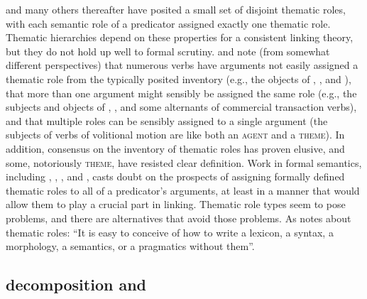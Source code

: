 \documentclass[output=paper
	        ,collection
	        ,collectionchapter
 	        ,biblatex
                ,babelshorthands
                ,newtxmath
                ,draftmode
                ,colorlinks, citecolor=brown
]{langscibook}
\begin{document}
\citet{Fillmore1968} and many others thereafter have posited a small set of disjoint thematic roles, with each semantic role of a predicator assigned exactly one thematic role.
Thematic hierarchies depend on these properties for a consistent linking theory, but they do not hold up well to formal scrutiny.
\citet{Jackendoff1987} and \citet{Dowty1991} note (from somewhat different perspectives) that numerous verbs have arguments not easily assigned a thematic role from the typically posited inventory (e.g., the objects of , , and ), that more than one argument might sensibly be assigned the same role (e.g., the subjects and objects of , , and some alternants of commercial transaction verbs), and that multiple roles can be sensibly assigned to a single argument (the subjects of verbs of volitional motion are like both an \textsc{agent} and a \textsc{theme}).
In addition, consensus on the inventory of thematic roles has proven elusive, and some, notoriously \textsc{theme}, have resisted clear definition.
Work in formal semantics, including \citet{LadusawandDowty1988}, \citet{Dowty1989}, \citet{Landman2000}, and \cite{Schein2002}, casts doubt on the prospects of assigning formally defined thematic roles to all of a predicator's arguments, at least in a manner that would allow them to play a crucial part in linking.
Thematic role types seem to pose problems, and there are alternatives that avoid those problems.  As \citet{Carlson1998} notes about thematic roles: ``It is easy to conceive of how to write a lexicon, a syntax, a morphology, a semantics, or a pragmatics without them''.

%


\subsection{\content decomposition and \argst}
%
%
%
\end{document}
